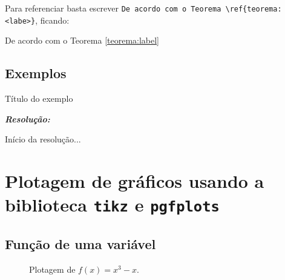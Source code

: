 Para referenciar basta escrever \verb|De acordo com o Teorema \ref{teorema:<labe>}|, ficando:

De acordo com o Teorema \ref{teorema:label}




\subsection{Exemplos}

\begin{exemplo}
    Título do exemplo

    \textbf{\textit{Resolução:}}
    
    Início da resolução...\fimresolucao
\end{exemplo}






\section{Plotagem de gráficos usando a biblioteca \texttt{tikz} e \texttt{pgfplots}}

\subsection{Função de uma variável}

\begin{figure}[H]
	\centering
	
	
	\label{fig:funcao_uma_variavel}
	\caption{Plotagem de \( f(x) = x^3 - x \).}
\end{figure}


